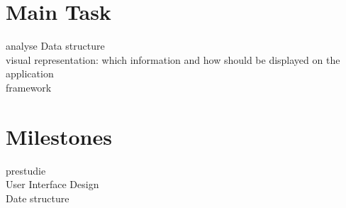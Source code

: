 \documentclass[a4page]{article}
\begin{document}
\section{Main Task}
 analyse Data structure\\
visual representation: which information and how should be displayed on the application\\
framework\\

\section{Milestones}
prestudie\\
User Interface Design\\
Date structure\\





\end{document}

